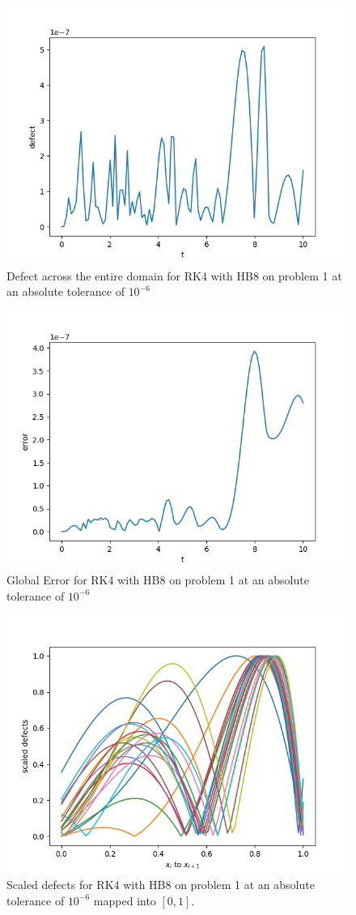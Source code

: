 \begin{figure}[H]
\centering
\includegraphics[width=0.7\linewidth]{./figures/rk4_with_hb8_p1_global_defect}
\caption{Defect across the entire domain for RK4 with HB8 on problem 1 at an absolute tolerance of $10^{-6}$}
\label{fig:rk4_with_hb8_p1_global_defect}
\end{figure}

\begin{figure}[H]
\centering
\includegraphics[width=0.7\linewidth]{./figures/rk4_with_hb8_p1_global_error}
\caption{Global Error for RK4 with HB8 on problem 1 at an absolute tolerance of $10^{-6}$}
\label{fig:rk4_with_hb8_p1_global_error}
\end{figure}

\begin{figure}[H]
\centering
\includegraphics[width=0.7\linewidth]{./figures/rk4_with_hb8_p1_scaled_defects}
\caption{Scaled defects for RK4 with HB8 on problem 1 at an absolute tolerance of $10^{-6}$ mapped into $[0, 1]$.}
\label{fig:rk4_with_hb8_p1_scaled_defects}
\end{figure}

